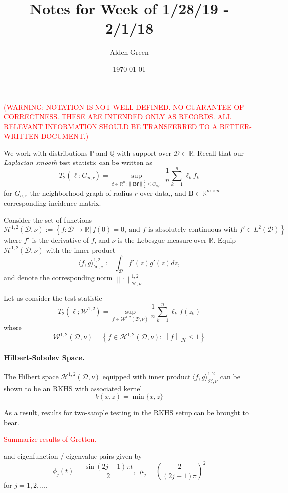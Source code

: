 \documentclass{article}
\newcommand{\Reals}{\mathbb{R}}
\newcommand{\norm}[1]{\left\lVert#1\right\rVert}
\newcommand{\dotp}[2]{\langle #1 , #2 \rangle}
\newcommand{\set}[1]{\left\{#1\right\}}
\newcommand{\Bbf}{\mathbf{B}}
\newcommand{\lbf}{\bm{\ell}}
\newcommand{\fbf}{\mathbf{f}}
\newcommand{\Dset}{\mathcal{D}}
\newcommand{\Wset}{\mathcal{W}}
\newcommand{\Hset}{\mathcal{H}}
\newcommand{\Pbb}{\mathbb{P}}
\newcommand{\Qbb}{\mathbb{Q}}
\newcommand{\1}{\mathbf{1}}
\theoremstyle{alden}
\theoremstyle{aldenthm}
\theoremstyle{remark}
\begin{document}
	
\title{Notes for Week of 1/28/19 - 2/1/18}
\author{Alden Green}
\date{\today}
\maketitle

\textcolor{red}{(WARNING: NOTATION IS NOT WELL-DEFINED. NO GUARANTEE OF CORRECTNESS. THESE ARE INTENDED ONLY AS RECORDS. ALL RELEVANT INFORMATION SHOULD BE TRANSFERRED TO A BETTER-WRITTEN DOCUMENT.)}

We work with distributions $\Pbb$ and $\Qbb$ with support over $\Dset \subset \Reals$. Recall that our \emph{Laplacian smooth} test statistic can be written as
\begin{equation*}
T_2(\lbf; G_{n,r}) = \sup_{\fbf \in \Reals^n: \norm{\Bbf \fbf}_2^2 \leq C_{n,r}} ~ \frac{1}{n} \sum_{k = 1}^{n} \ell_k f_k
\end{equation*}
for $G_{n,r}$ the neighborhood graph of radius $r$ over data,, and $\Bbf \in \Reals^{m \times n}$ corresponding incidence matrix.

Consider the set of functions
\begin{equation*}
\mathcal{H}^{1,2}(\Dset,\nu) := \set{f: \Dset \to \Reals \vert ~f(0) = 0,~ \text{and $f$ is absolutely continuous with $f' \in L^2(\Dset)$} }
\end{equation*}
where $f'$ is the derivative of $f$, and $\nu$ is the Lebesgue measure over $\Reals$. Equip $\Hset^{1,2}(\Dset,\nu)$ with the inner product
\begin{equation*}
\dotp{f}{g}_{\Hset, \nu}^{1,2} := \int_{\Dset} f'(z) g'(z) dz,
\end{equation*} 
and denote the corresponding norm $\norm{\cdot}_{\Hset, \nu}^{1,2}$

Let us consider the test statistic
\begin{equation*}
T_2(\lbf; \Wset^{1,2}) = \sup_{f \in \Wset^{1,2}(\Dset, \nu)} \frac{1}{n} \sum_{k=1}^{n} \ell_k f(z_k)
\end{equation*}
where
\begin{equation*}
\Wset^{1,2}(\Dset, \nu) = \set{f \in \Hset^{1,2}(\Dset,\nu): \norm{f}_{\Hset} \leq 1}
\end{equation*}

\paragraph{Hilbert-Sobolev Space.}
The Hilbert space $\Hset^{1,2}(\Dset,\nu)$ equipped with inner product $\dotp{f}{g}_{\Hset, \nu}^{1,2}$ can be shown to be an RKHS with associated kernel
\begin{equation*}
k(x,z) = \min\{x,z\}
\end{equation*}

As a result, results for two-sample testing in the RKHS setup can be brought to bear.

\textcolor{red}{Summarize results of Gretton.}

and eigenfunction / eigenvalue pairs given by
\begin{equation*}
\phi_j(t) = \frac{\sin(2j - 1)\pi t}{2}, ~~ \mu_j = \left(\frac{2}{(2j - 1)\pi}\right)^2
\end{equation*}
for $j = 1,2,\ldots$.
\end{document}
